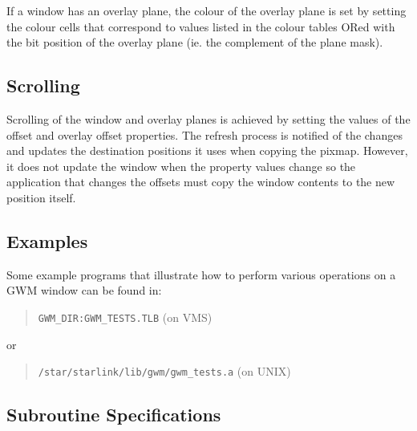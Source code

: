 If a window has an overlay plane, the colour of the overlay plane is set
by setting the colour cells that correspond to values listed in the
colour tables ORed with the bit position of the overlay plane (ie. the
complement of the plane mask).

\subsection{Scrolling}
Scrolling of the window and overlay planes is achieved by setting the
values of the offset and overlay offset properties. The refresh process
is notified of the changes and updates the destination positions it uses
when copying the pixmap. However, it does not update the window when the
property values change so the application that changes the offsets must
copy the window contents to the new position itself.

\subsection{Examples}

Some example programs that illustrate how to perform various operations on a
GWM window can be found in:
\begin{quote}
{\tt GWM\_DIR:GWM\_TESTS.TLB} (on VMS)
\end{quote}
or
\begin{quote}
{\tt /star/starlink/lib/gwm/gwm\_tests.a} (on UNIX)
\end{quote}

\newpage
\subsection{Subroutine Specifications}

